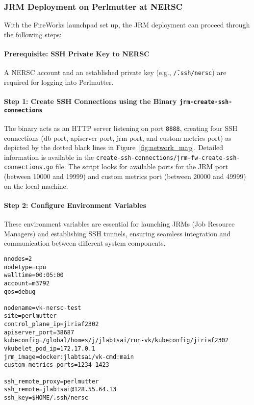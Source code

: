 \subsubsection{JRM Deployment on Perlmutter at NERSC}

With the FireWorks launchpad set up, the JRM deployment can proceed through the following steps:

\paragraph{Prerequisite: SSH Private Key to NERSC}
A NERSC account and an established private key (e.g., \texttt{\~/.ssh/nersc}) are required for logging into Perlmutter.

\paragraph{Step 1: Create SSH Connections using the Binary \texttt{jrm-create-ssh-connections}}
The binary acts as an HTTP server listening on port \texttt{8888}, creating four SSH connections (db port, apiserver port, jrm port, and custom metrics port) as depicted by the dotted black lines in Figure~\ref{fig:network_map}. Detailed information is available in the \texttt{create-ssh-connections/jrm-fw-create-ssh-connections.go} file. The script looks for available ports for the JRM port (between 10000 and 19999) and custom metrics port (between 20000 and 49999) on the local machine.

\paragraph{Step 2: Configure Environment Variables}
These environment variables are essential for launching JRMs (Job Resource Managers) and establishing SSH tunnels, ensuring seamless integration and communication between different system components.

\begin{verbatim}
nnodes=2
nodetype=cpu
walltime=00:05:00
account=m3792
qos=debug

nodename=vk-nersc-test
site=perlmutter
control_plane_ip=jiriaf2302
apiserver_port=38687
kubeconfig=/global/homes/j/jlabtsai/run-vk/kubeconfig/jiriaf2302
vkubelet_pod_ip=172.17.0.1
jrm_image=docker:jlabtsai/vk-cmd:main
custom_metrics_ports=1234 1423

ssh_remote_proxy=perlmutter
ssh_remote=jlabtsai@128.55.64.13
ssh_key=$HOME/.ssh/nersc
\end{verbatim}

